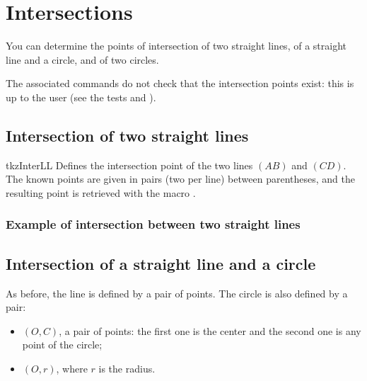 \section{Intersections}

You can determine the points of intersection of two straight lines, of a straight line and a circle, and of two circles.

The associated commands do not check that the intersection points exist: this is up to the user (see the tests  and ).

\subsection{Intersection of two straight lines }
\begin{NewMacroBox}{tkzInterLL}{}%
Defines the intersection point  of the two lines $(AB)$ and $(CD)$. The known points are given in pairs (two per line) between parentheses, and the resulting point is retrieved with the macro .
\end{NewMacroBox}

\subsubsection{Example of intersection between two straight lines}

\begin{tkzexample}[latex=7cm,small]
\end{tkzexample}

\subsection{Intersection of a straight line and a circle  }

As before, the line is defined by a pair of points. The circle
 is also defined by a pair:
\begin{itemize}
\item $(O,C)$, a pair of points: the first one is the center and the second one is any point of the circle;
\item $(O,r)$, where $r$ is the radius.
\end{itemize}

